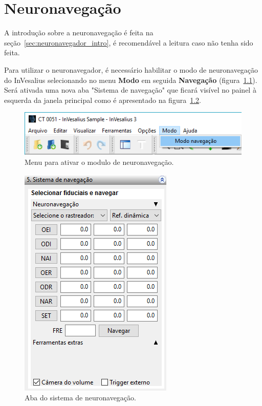 \chapter{Neuronavegação}
\label{sec:neuronavegador}

A introdução sobre a neuronavegação é feita na seção~\ref{sec:neuronavegador_intro}, é recomendável a leitura caso não tenha sido feita.

Para utilizar o neuronavegador, é necessário habilitar o modo de neuronavegação do InVesalius selecionando no menu \textbf{Modo} em seguida \textbf{Navegação} (figura~\ref{fig:nav_menu_pt}). Será ativada uma nova aba "Sistema de navegação" que ficará visível no painel à esquerda da janela principal como é apresentado na figura~\ref{fig:nav_painel_pt}.

\begin{figure}[!htb]
\centering
\includegraphics[scale=0.4]{../user_guide_figures/invesalius_screen/nav_menu_pt.png}
\caption{Menu para ativar o modulo de neuronavegação.}
\label{fig:nav_menu_pt}
\end{figure}

\begin{figure}[!htb]
\centering
\includegraphics[scale=0.6]{../user_guide_figures/invesalius_screen/nav_painel_pt.png}
\caption{Aba do sistema de neuronavegação.}
\label{fig:nav_painel_pt}
\end{figure}

